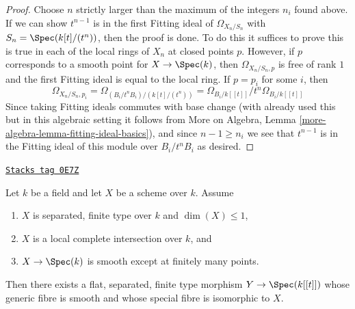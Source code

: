 \begin{proof}
Choose $n$ strictly larger than the maximum of the integers $n_i$ found above.
If we can show $t^{n - 1}$ is in the first Fitting ideal of
$\Omega_{X_n/S_n}$ with $S_n = \Spec(k[t]/(t^n))$, then the proof is done.
To do this it suffices to prove this is true in each of
the local rings of $X_n$ at closed points $p$.
However, if $p$ corresponds to a smooth point for $X \to \Spec(k)$,
then $\Omega_{X_n/S_n, p}$ is free of rank $1$ and the first Fitting
ideal is equal to the local ring. If $p = p_i$ for some $i$, then
$$
\Omega_{X_n/S_n, p_i} =
\Omega_{(B_i/t^nB_i)/(k[t]/(t^n))} =
\Omega_{B_i/k[[t]]}/t^n\Omega_{B_i/k[[t]]}
$$
Since taking Fitting ideals commutes with base change
(with already used this but in this algebraic setting
it follows from More on Algebra, Lemma
\ref{more-algebra-lemma-fitting-ideal-basics}),
and since $n - 1 \geq n_i$ we see that $t^{n - 1}$ is
in the Fitting ideal of this module over $B_i/t^nB_i$ as desired.
\end{proof}

\begin{lemma}
\label{examples-defos-lemma-smoothing-curve-isolated-lci}
\href{https://stacks.math.columbia.edu/tag/0E7Z}{\texttt{Stacks tag 0E7Z}}

Let $k$ be a field and let $X$ be a scheme over $k$. Assume
\begin{enumerate}
\item $X$ is separated, finite type over $k$ and $\dim(X) \leq 1$,
\item $X$ is a local complete intersection over $k$, and
\item $X \to \Spec(k)$ is smooth except at finitely many points.
\end{enumerate}
Then there exists a flat, separated, finite type morphism $Y \to \Spec(k[[t]])$
whose generic fibre is smooth and whose special fibre is
isomorphic to $X$.
\end{lemma}

